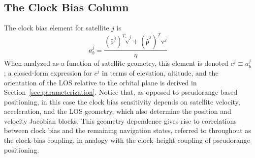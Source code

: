 \documentclass[letterpaper,times]{IONconf-v2}
\theoremstyle{plain}
\theoremstyle{remark}
\renewcommand{\vec}[1]{{\boldsymbol{\mathrm{#1}}}}
\begin{document}
\subsection{The Clock Bias Column}\label{subsec:partition}
%
%
The clock bias element for satellite $j$ is
\begin{equation}\label{eq:coupling_column}
a_b^j = \frac{(\hat{\vec\rho}^j)^T \dot{\bar{\vec{v}}}^j + (\dot{\hat{\vec\rho}}^j)^T \bar{\vec{v}}^j}{\eta}
\end{equation}
%
When analyzed as a function of satellite geometry, this element is denoted $c^j \equiv a_b^j$; a closed-form expression for $c^j$ in terms of elevation, altitude, and the orientation of the LOS relative to the orbital plane is derived in Section~\ref{sec:parameterization}. Notice that, as opposed to pseudorange-based positioning, in this case the clock bias sensitivity depends on satellite velocity, acceleration, and the LOS geometry, which also determine the position and velocity Jacobian blocks. This geometry dependence gives rise to correlations between clock bias and the remaining navigation states, referred to throughout as the clock-bias coupling, in analogy with the clock--height coupling of pseudorange positioning.
\end{document}
